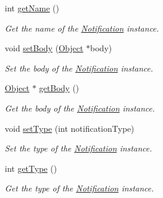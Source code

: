 \begin{DoxyCompactItemize}
\item 
int \hyperlink{class_pure_m_v_c_1_1_notification_aed76b38c526e916005fb55fc3d9f714f}{getName} ()
\begin{DoxyCompactList}\small\item\em Get the name of the {\ttfamily \hyperlink{class_pure_m_v_c_1_1_notification}{Notification}} instance. \item\end{DoxyCompactList}\item 
void \hyperlink{class_pure_m_v_c_1_1_notification_a9cae1ba418db7451e7afd6ddd40b2cbf}{setBody} (\hyperlink{class_pure_m_v_c_1_1_object}{Object} $\ast$body)
\begin{DoxyCompactList}\small\item\em Set the body of the {\ttfamily \hyperlink{class_pure_m_v_c_1_1_notification}{Notification}} instance. \item\end{DoxyCompactList}\item 
\hyperlink{class_pure_m_v_c_1_1_object}{Object} $\ast$ \hyperlink{class_pure_m_v_c_1_1_notification_a57b45067ffdee2037305396e190f83b9}{getBody} ()
\begin{DoxyCompactList}\small\item\em Get the body of the {\ttfamily \hyperlink{class_pure_m_v_c_1_1_notification}{Notification}} instance. \item\end{DoxyCompactList}\item 
void \hyperlink{class_pure_m_v_c_1_1_notification_aeec90bbe612bca8631ac92c13727feef}{setType} (int notificationType)
\begin{DoxyCompactList}\small\item\em Set the type of the {\ttfamily \hyperlink{class_pure_m_v_c_1_1_notification}{Notification}} instance. \item\end{DoxyCompactList}\item 
int \hyperlink{class_pure_m_v_c_1_1_notification_a05e70c01afdee0dbaff570789ee761b1}{getType} ()
\begin{DoxyCompactList}\small\item\em Get the type of the {\ttfamily \hyperlink{class_pure_m_v_c_1_1_notification}{Notification}} instance. \item\end{DoxyCompactList}\end{DoxyCompactItemize}
